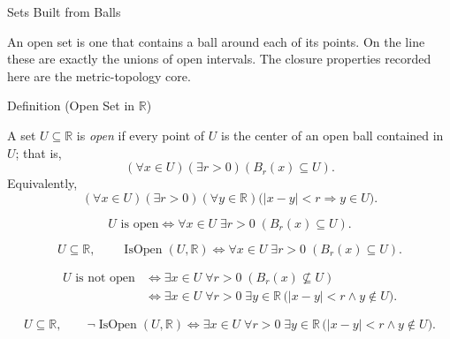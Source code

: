 \label{sec:open-sets}

\begin{topicbox}{Sets Built from Balls}
\begin{exposition}
An open set is one that contains a ball around each of its points. On the line these are exactly the unions of open intervals. The closure properties recorded here are the metric-topology core.
\end{exposition}
\end{topicbox}
\begin{definitionbox}{Definition (Open Set in $\mathbb{R}$)}
\begin{definition}
\label{def:open-set}
A set $U\subseteq\mathbb{R}$ is \emph{open} if every point of $U$ is the
center of an open ball contained in $U$; that is,
\[
  (\forall x\in U)(\exists r>0)(B_r(x)\subseteq U).
\]
Equivalently,
\[
  (\forall x\in U)(\exists r>0)(\forall y\in\mathbb{R})
  \bigl(|x-y|<r\Longrightarrow y\in U\bigr).
\]
\end{definition}
\end{definitionbox}
\begin{remark*}
\[
U \text{ is open} \Longleftrightarrow \forall x\in U\;\exists r>0\;(B_{r}(x)\subseteq U).
\]
\end{remark*}

\begin{remark*}
\[
U\subseteq\mathbb{R},\qquad
\operatorname{IsOpen}(U,\mathbb{R})
\Longleftrightarrow
\forall x\in U\;\exists r>0\;(B_{r}(x)\subseteq U).
\]
\end{remark*}
\begin{remark*}
\[
\begin{aligned}
U \text{ is not open}
&\Longleftrightarrow
\exists x\in U\;\forall r>0\;(B_{r}(x)\not\subseteq U)\\
&\Longleftrightarrow
\exists x\in U\;\forall r>0\;\exists y\in\mathbb{R}\,
\bigl(|x-y|<r\land y\notin U\bigr).
\end{aligned}
\]
\end{remark*}
\begin{remark*}
\[
U\subseteq\mathbb{R},\qquad
\neg\operatorname{IsOpen}(U,\mathbb{R})
\Longleftrightarrow
\exists x\in U\;\forall r>0\;\exists y\in\mathbb{R}\,
\bigl(|x-y|<r\land y\notin U\bigr).
\]
\end{remark*}

